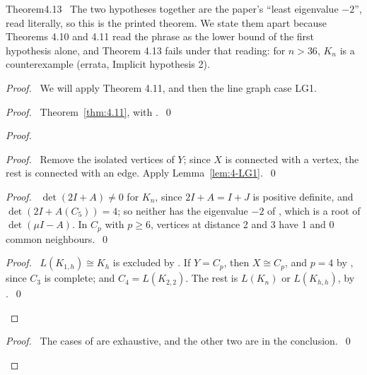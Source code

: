 \begin{cgss}{Theorem}{4.13}\label{thm:4.13}
 \new\ The two hypotheses together are the paper's ``least eigenvalue $-2$'', read literally,
 so this is the printed theorem. We state them apart because Theorems 4.10 and 4.11 read the
 phrase as the lower bound of the first hypothesis alone, and Theorem 4.13 fails under that
 reading: for $n>36$, $K_n$ is a counterexample (errata, Implicit hypothesis 2).
\end{cgss}
\begin{proof}
 \pfsketch\ We will apply Theorem 4.11, and then the line graph case LG1.
 \begin{proof}\pf\ Theorem~\ref{thm:4.11}, with .~\qed\end{proof}
 \begin{proof}
  \begin{proof}\pf\ Remove the isolated vertices of $Y$; since $X$ is connected with a vertex,
   the rest is connected with an edge. Apply Lemma~\ref{lem:4-LG1}.~\qed\end{proof}
  \begin{proof}\pf\ $\det(2I+A)\ne0$ for $K_n$, since $2I+A=I+J$ is positive definite, and
   $\det(2I+A(C_5))=4$; so neither has the eigenvalue $-2$ of , which is a root of
   $\det(\mu I-A)$. In $C_p$ with $p\ge6$, vertices at distance
   2 and 3 have 1 and 0 common neighbours.~\qed\end{proof}
  \qedstep
  \begin{proof}\pf\ $L(K_{1,h})\cong K_h$ is excluded by . If $Y=C_p$, then
   $X\cong C_p$, and $p=4$ by , since $C_3$ is complete; and
   $C_4=L(K_{2,2})$. The rest is $L(K_n)$ or $L(K_{h,h})$, by .~\qed\end{proof}
 \end{proof}
 \qedstep
 \begin{proof}\pf\ The cases of  are exhaustive, and the other two are in the
  conclusion.~\qed\end{proof}
\end{proof}

